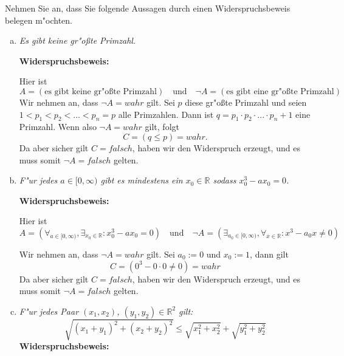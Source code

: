 \documentclass[10pt, oneside]{article}
\begin{document}
Nehmen Sie an, dass Sie folgende Aussagen durch einen Widerspruchsbeweis
belegen m"ochten.
\begin{enumerate}[a)]
    \item \textit{Es gibt keine gr"o{\ss}te Primzahl}.

        \textbf{Widerspruchsbeweis:}

        Hier ist
        \begin{equation*}
            A = (\text{es gibt keine gr"o{\ss}te Primzahl}) 
            \quad\text{und}\quad 
            \lnot A = (\text{es gibt eine gr"o{\ss}te Primzahl})
        \end{equation*}
        Wir nehmen an, dass $\lnot A = wahr$ gilt. Sei $p$ diese gr"o{\ss}te
        Primzahl und seien $1 < p_1 < p_2 < ... < p_n = p$ alle Primzahlen.
        Dann ist $q = p_1 \cdot p_2 \cdot ... \cdot p_n + 1$ eine Primzahl.
        Wenn also $\lnot A = wahr$ gilt, folgt
        \begin{equation*}
            C = (q \leq p) = wahr.
        \end{equation*}
        Da aber sicher gilt $C = falsch$, haben wir den Widerspruch erzeugt,
        und es muss somit $\lnot A = falsch$ gelten.
    \item \textit{F"ur jedes $a \in [0, \infty)$ gibt es mindestens ein $x_0 \in \mathbb{R}$ sodass $x_0^3 - ax_0 = 0$.}

        \textbf{Widerspruchsbeweis:}

        Hier ist
        \begin{equation*}
            A = (\forall_{a \in [0, \infty)}, \exists_{x_0 \in \mathbb{R}} : x_0^3 - ax_0 = 0)
            \quad\text{und}\quad
            \lnot A = (\exists_{a_0 \in [0, \infty)}, \forall_{x \in \mathbb{R}} : x^3 - a_0x \neq 0)
        \end{equation*}

        \pagebreak
        Wir nehmen an, dass $\lnot A = wahr$ gilt. Sei $a_0 := 0$ und $x_0 := 1$, dann gilt
        \begin{equation*}
            C = (0^3 - 0 \cdot 0 \neq 0) = wahr
        \end{equation*}
        Da aber sicher gilt $C = falsch$, haben wir den Widerspruch erzeugt,
        und es muss somit $\lnot A = falsch$ gelten.
    \item \textit{F"ur jedes Paar $(x_1, x_2)$, $(y_1, y_2) \in \mathbb{R}^2$ gilt:}
        \begin{equation*}
            \sqrt{(x_1 + y_1)^2 + (x_2 + y_2)^2} \leq \sqrt{x_1^2 + x_2^2} + \sqrt{y_1^2 + y_2^2}
        \end{equation*}
        \textbf{Widerspruchsbeweis:}


\end{enumerate}
\end{document}
